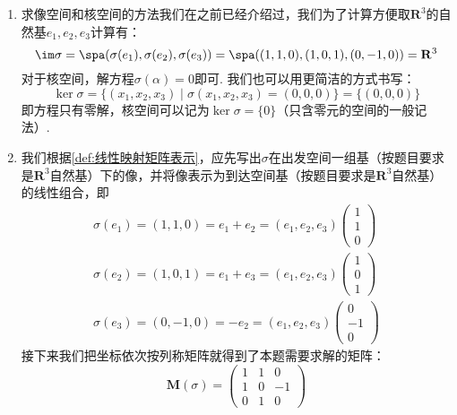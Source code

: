 \begin{solution}
    \begin{enumerate}
        \item 求像空间和核空间的方法我们在之前已经介绍过，我们为了计算方便取$\mathbf{R}^3$的自然基$e_1,e_2,e_3$计算有：
              \[\im\sigma=\spa(\sigma(e_1),\sigma(e_2),\sigma(e_3))=\spa((1,1,0),(1,0,1),(0,-1,0))=\mathbf{R}^3\]
              对于核空间，解方程$\sigma(\alpha)=0$即可. 我们也可以用更简洁的方式书写：
              \[\ker\sigma=\{(x_1,x_2,x_3)\mid \sigma(x_1,x_2,x_3)=(0,0,0)\}=\{(0,0,0)\}\]
              即方程只有零解，核空间可以记为$\ker\sigma=\{0\}$（只含零元的空间的一般记法）.

        \item 我们根据\autoref{def:线性映射矩阵表示}，应先写出$\sigma$在出发空间一组基（按题目要求是$\mathbf{R}^3$自然基）下的像，并将像表示为到达空间基（按题目要求是$\mathbf{R}^3$自然基）的线性组合，即
              \begin{gather*}
                  \sigma(e_1)=(1,1,0)=e_1+e_2=(e_1,e_2,e_3)\begin{pmatrix}
                      1 \\ 1 \\ 0
                  \end{pmatrix} \\
                  \sigma(e_2)=(1,0,1)=e_1+e_3=(e_1,e_2,e_3)\begin{pmatrix}
                      1 \\ 0 \\ 1
                  \end{pmatrix} \\
                  \sigma(e_3)=(0,-1,0)=-e_2=(e_1,e_2,e_3)\begin{pmatrix}
                      0 \\ -1 \\ 0
                  \end{pmatrix}
              \end{gather*}
              接下来我们把坐标依次按列称矩阵就得到了本题需要求解的矩阵：
              \[\mathbf{M}(\sigma)=\begin{pmatrix}
                      1 & 1 & 0  \\
                      1 & 0 & -1 \\
                      0 & 1 & 0
                  \end{pmatrix}\]
    \end{enumerate}
\end{solution}

